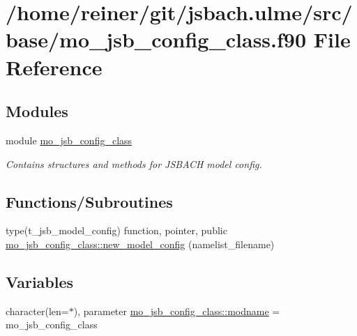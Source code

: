 \hypertarget{mo__jsb__config__class_8f90}{}\section{/home/reiner/git/jsbach.ulme/src/base/mo\+\_\+jsb\+\_\+config\+\_\+class.f90 File Reference}
\label{mo__jsb__config__class_8f90}
\subsection*{Modules}
\begin{DoxyCompactItemize}
\item 
module \hyperlink{namespacemo__jsb__config__class}{mo\+\_\+jsb\+\_\+config\+\_\+class}
\begin{DoxyCompactList}\small\item\em Contains structures and methods for J\+S\+B\+A\+C\+H model config. \end{DoxyCompactList}\end{DoxyCompactItemize}
\subsection*{Functions/\+Subroutines}
\begin{DoxyCompactItemize}
\item 
type(t\+\_\+jsb\+\_\+model\+\_\+config) function, pointer, public \hyperlink{namespacemo__jsb__config__class_a1954d6f33b1cea7b395655837a1377db}{mo\+\_\+jsb\+\_\+config\+\_\+class\+::new\+\_\+model\+\_\+config} (namelist\+\_\+filename)
\end{DoxyCompactItemize}
\subsection*{Variables}
\begin{DoxyCompactItemize}
\item 
character(len=$\ast$), parameter \hyperlink{namespacemo__jsb__config__class_afe047bc8cf7a4d227f9421eaa14e2d80}{mo\+\_\+jsb\+\_\+config\+\_\+class\+::modname} = \textquotesingle{}mo\+\_\+jsb\+\_\+config\+\_\+class\textquotesingle{}
\end{DoxyCompactItemize}
